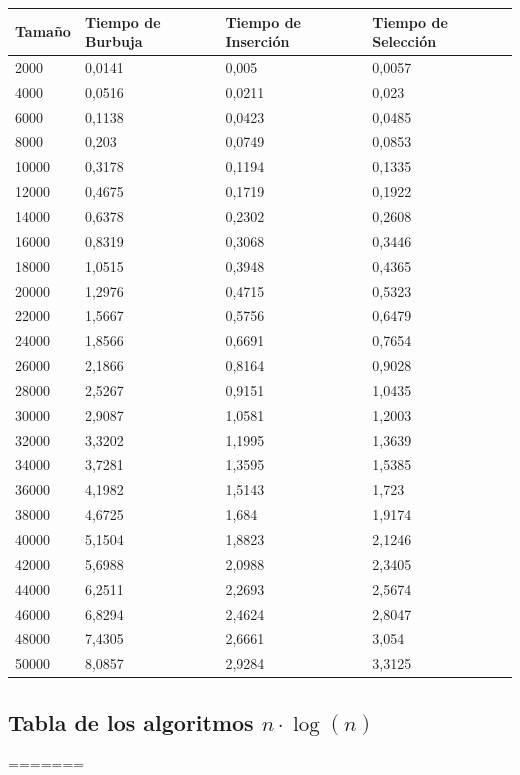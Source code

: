 \documentclass[a4paper, 11pt]{article}
\begin{document}
\begin{tabular}{|l|l|l|l|}
	\hline
	Tamaño &Tiempo de Burbuja &Tiempo de  Inserción &Tiempo de  Selección \\
	\hline
	\hline
	2000 & 0,0141 & 0,005 & 0,0057 \\
	\hline
	4000 & 0,0516 & 0,0211 & 0,023 \\
	\hline
	6000 & 0,1138 & 0,0423 & 0,0485 \\
	\hline
	8000 & 0,203 & 0,0749 & 0,0853 \\
	\hline
	10000 & 0,3178 & 0,1194 & 0,1335 \\
	\hline
	12000 & 0,4675 & 0,1719 & 0,1922 \\
	\hline
	14000 & 0,6378 & 0,2302 & 0,2608 \\
	\hline
	16000 & 0,8319 & 0,3068 & 0,3446 \\
	\hline
	18000 & 1,0515 & 0,3948 & 0,4365 \\
	\hline
	20000 & 1,2976 & 0,4715 & 0,5323 \\
	\hline
	22000 & 1,5667 & 0,5756 & 0,6479 \\
	\hline
	24000 & 1,8566 & 0,6691 & 0,7654 \\
	\hline
	26000 & 2,1866 & 0,8164 & 0,9028 \\
	\hline
	28000 & 2,5267 & 0,9151 & 1,0435 \\
	\hline
	30000 & 2,9087 & 1,0581 & 1,2003 \\
	\hline
	32000 & 3,3202 & 1,1995 & 1,3639 \\
	\hline
	34000 & 3,7281 & 1,3595 & 1,5385 \\
	\hline
	36000 & 4,1982 & 1,5143 & 1,723 \\
	\hline
	38000 & 4,6725 & 1,684 & 1,9174 \\
	\hline
	40000 & 5,1504 & 1,8823 & 2,1246 \\
	\hline
	42000 & 5,6988 & 2,0988 & 2,3405 \\
	\hline
	44000 & 6,2511 & 2,2693 & 2,5674 \\
	\hline
	46000 & 6,8294 & 2,4624 & 2,8047 \\
	\hline
	48000 & 7,4305 & 2,6661 & 3,054 \\
	\hline
	50000 & 8,0857 & 2,9284 & 3,3125 \\
	\hline
\end{tabular}

\subsection{Tabla de los algoritmos $n\cdot \log(n)$ }
=======
\end{document}
